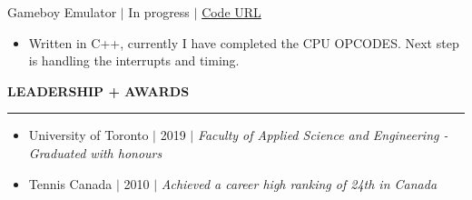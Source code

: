 \documentclass[12pt]{article}
\newcommand{\sectionRule}{\textcolor{gray}{\rule{7.27in}{0.02cm}}}
\newcommand{\sectionTxt}[1]{\noindent\textbf{#1}\\}
\newcommand{\textDate}[3]{\noindent#1 $|$ #2 $|$ {\color{textGray} #3}}
\begin{document}
    \textDate{Gameboy Emulator}{In progress}{\href{https://github.com/Sammyalhashe/GameboyEmulator}{Code URL}}
    \begin{small}
        \begin{itemize}
            \itemsep0em 
            \item {\color{textGray} Written in C++, currently I have completed the CPU OPCODES. Next step is handling the interrupts and timing.}
        \end{itemize}
    \end{small}

    \sectionTxt{LEADERSHIP + AWARDS}
    \sectionRule

    \begin{small}
        \begin{itemize}
            \itemsep0em
            \item {\color{textGray} \textDate{University of Toronto}{2019}{\textit{Faculty of Applied Science and Engineering - Graduated with honours}}}
            \item {\color{textGray} \textDate{Tennis Canada}{2010}{\textit{Achieved a career high ranking of 24th in Canada}}}
        \end{itemize}
    \end{small}
\end{document}
